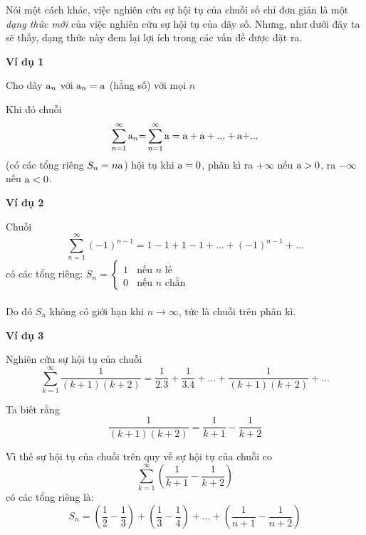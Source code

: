 \documentclass[12pt,a4paper]{book}
\begin{document}
	Nói một cách khác, việc nghiên cứu sự hội tụ của chuỗi số chỉ đơn giản là một \textit{dạng thức mới} của việc nghiên cứu sự hội tụ của dãy số.
Nhưng, như dưới đây ta sẽ thấy, dạng thức này đem lại lợi ích trong các vấn đề được đặt ra.\\

\par\textbf{Ví dụ 1}

Cho dãy ${{\rm{a}}_n}$ với ${\rm{a}}_n=\rm{a}$ (hằng số) với mọi $n$\par
Khi đó chuỗi
\[\sum\limits_{n = 1}^\infty  {{{\rm{a}}_n}} {\rm{ = }}\sum\limits_{n = 1}^\infty  {\rm{a}}  = {\rm{a}} + {\rm{a}} + ... + {\rm{a + }}...\]
(có các tổng riêng $S_n=n\rm{a}$) hội tụ khi $\rm{a=0}$, phân kì ra $+\infty$ nếu $\rm{a>0}$, ra $-\infty$ nếu $\rm{a<0}$.\\

\par\textbf{Ví dụ 2}

Chuỗi
\[\sum\limits_{n = 1}^\infty  {{{( - 1)}^{n - 1}}}  = 1 - 1 + 1 - 1 + ... + {( - 1)^{n - 1}} + ...\]
có các tổng riêng:
$S_n = \left\{\begin{array}{l}
1 \ \ \ \ \textrm{nếu $n$ lẻ}\\
0 \ \ \ \ \textrm{nếu $n$ chẵn}
\end{array}\right.$\\\\

Do đó $S_n$ không có giới hạn khi $n \to \infty$, tức là chuỗi trên phân kì.\\

\par\textbf{Ví dụ 3}

Nghiên cứu sự hội tụ của chuỗi
\[\sum\limits_{k = 1}^\infty  {\dfrac{1}{{(k + 1)(k + 2)}}}  = \dfrac{1}{{2.3}} + \dfrac{1}{{3.4}} + ... + \dfrac{1}{{(k + 1)(k + 2)}} + ...\]\par
Ta biết rằng
\[\dfrac{1}{{(k + 1)(k + 2)}} = \dfrac{1}{{k + 1}} - \dfrac{1}{{k + 2}}\]\par
Vì thế sự hội tụ của chuỗi trên quy về sự hội tụ của chuỗi co 
\[\sum\limits_{k = 1}^\infty  {\left( {\dfrac{1}{{k + 1}} - \dfrac{1}{{k + 2}}} \right)} \]
có các tổng riêng là:
\[{S_n} = \left( {\dfrac{1}{2} - \dfrac{1}{3}} \right) + \left( {\dfrac{1}{3} - \dfrac{1}{4}} \right) + ... + \left( {\dfrac{1}{{n + 1}} - \dfrac{1}{{n + 2}}} \right)\]
\end{document}

